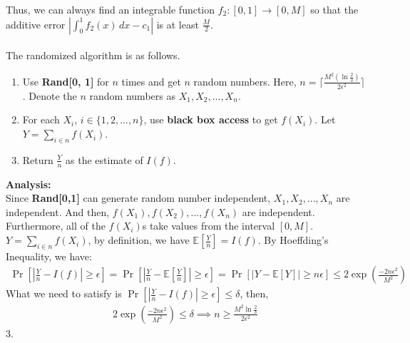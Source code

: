 Thus, we can always find an integrable function 
$f_2 : [0, 1]\rightarrow [0, M]$ so that the additive error $|\int_{0}^{1} f_2(x) \,dx - c_1|$ is at least $\frac{M}{2}$.
\\
\noindent {}\\
The randomized algorithm is as follows.
\begin{enumerate}
    \item Use \textbf{Rand[0, 1]} for $n$ times and get $n$ random numbers.
    Here, $n=\lceil \frac{M^2(\ln \frac{2}{\delta})}{2\epsilon^2}\rceil $.
    Denote the $n$ random numbers as $X_1, X_2, ..., X_{n}$.
    \item For each $X_i$, $i\in \{1,2,...,n\}$, use \textbf{black box access} to get $f(X_i)$.
    Let $Y=\sum_{i\in n}f(X_i)$.
    \item Return $\frac{Y}{n}$ as the estimate of $I(f)$.
\end{enumerate}
\textbf{Analysis:}\\
Since \textbf{Rand[0,1]} can generate random number independent,
$X_1, X_2,..., X_{n}$ are independent.
And then, $f(X_1), f(X_2),..., f(X_{n})$ are independent.
Furthermore, all of the $f(X_i)$s take values from the interval $[0, M]$.
$Y=\sum_{i\in n}f(X_i)$, by definition, we have $\mathbb{E}[\frac{Y}{n}]=I(f)$.
By Hoeffding's Inequality, we have:
\begin{align}
    \nonumber \Pr[|\frac{Y}{n}-I(f)|\ge\epsilon]=\Pr[|\frac{Y}{n}-\mathbb{E}[\frac{Y}{n}]|\ge\epsilon]
    =\Pr[|Y-\mathbb{E}[Y]|\ge n\epsilon]\le 2\exp({\frac{-2n\epsilon^2}{M^2}})
\end{align}
What we need to satisfy is $\Pr[|\frac{Y}{n}-I(f)|\ge\epsilon]\le \delta$, then,
\begin{align}
    \nonumber 2\exp({\frac{-2n\epsilon^2}{M^2}}) \le \delta \implies n\ge \frac{M^2\ln \frac{2}{\delta}}{2\epsilon^2}
\end{align}
3.
